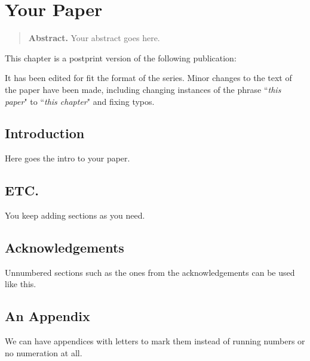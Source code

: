 \chapter{Your Paper}


\begin{quote}
\textbf{Abstract.}
Your abstract goes here.
\end{quote}

\cleardoublepage

This chapter is a postprint version of the following publication:
\begin{quote}
\end{quote}

\noindent
It has been edited for fit the format of the \DataLinguistica series.
Minor changes to the text of the paper have been made, including changing instances of the phrase ``\textit{this paper}" to ``\textit{this chapter}" and fixing typos.



\section{Introduction}
Here goes the intro to your paper.

\section{ETC.}
You keep adding sections as you need.


\cleardoublepage


\section*{Acknowledgements}
Unnumbered sections such as the ones from the acknowledgements can be used like this.


\cleardoublepage


\begin{subappendices}

\section{An Appendix}
We can have appendices with letters to mark them instead of running numbers or no numeration at all.

    
\end{subappendices}